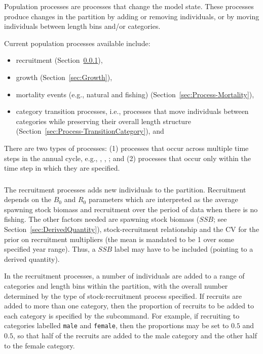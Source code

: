 
Population processes are processes that change the model state. These processes produce changes in the partition by adding or removing individuals, or by moving individuals between length bins and/or categories.

Current population processes available include:

\begin{itemize}
\item recruitment (Section~\ref{sec:Process-Recruitment}),
\item growth (Section~\ref{sec:Growth}),
\item mortality events (e.g., natural and fishing) (Section~\ref{sec:Process-Mortality}), 
\item category transition processes, i.e., processes that move individuals between categories while preserving their overall length structure (Section~\ref{sec:Process-TransitionCategory}), and
\end{itemize}

There are two types of processes: (1) processes that occur across multiple time steps in the annual cycle, e.g., , , ; and (2) processes that occur only within the time step in which they are specified.

\subsubsection{}\label{sec:Process-Recruitment}

The recruitment processes adds new individuals to the partition. Recruitment depends on the \(B_{0}\) and \(R_{0}\) parameters which are interpreted as the average spawning stock biomass and recruitment over the period of data when there is no fishing. The other factors needed are spawning stock biomass ($SSB$; see Section~\ref{sec:DerivedQuantity}), stock-recruitment relationship and the CV for the prior on recruitment multipliers (the mean is mandated to be 1 over some specified year range). Thus, a $SSB$ label may have to be included (pointing to a derived quantity).

In the recruitment processes, a number of individuals are added to a range of categories and length bins within the partition, with the overall number determined by the type of stock-recruitment process specified. If recruits are added to more than one category, then the proportion of recruits to be added to each category is specified by the  subcommand. For example, if recruiting to categories labelled \texttt{male} and \texttt{female}, then the proportions may be set to $0.5$ and $0.5$, so that half of the recruits are added to the male category and the other half to the female category.

